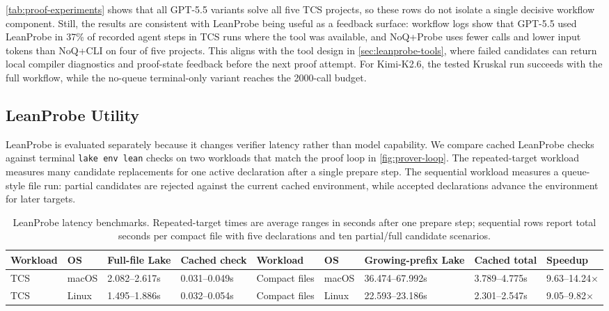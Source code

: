 \documentclass{article}
\newcommand{\kimi}{Kimi-K2.6\xspace}
\newcommand{\gpt}{GPT-5.5\xspace}
\begin{document}
\cref{tab:proof-experiments} shows that all \gpt variants solve all five TCS projects, so these rows do not isolate a single decisive workflow component.
Still, the results are consistent with LeanProbe being useful as a feedback surface: workflow logs show that \gpt used LeanProbe in 37\% of recorded agent steps in TCS runs where the tool was available, and NoQ+Probe uses fewer calls and lower input tokens than NoQ+CLI on four of five projects.
This aligns with the tool design in \cref{sec:leanprobe-tools}, where failed candidates can return local compiler diagnostics and proof-state feedback before the next proof attempt.
For \kimi, the tested Kruskal run succeeds with the full workflow, while the no-queue terminal-only variant reaches the 2000-call budget.

\subsection{LeanProbe Utility}

LeanProbe is evaluated separately because it changes verifier latency rather than model capability.
We compare cached LeanProbe checks against terminal \texttt{lake env lean} checks on two workloads that match the proof loop in \cref{fig:prover-loop}.
The repeated-target workload measures many candidate replacements for one active declaration after a single prepare step.
The sequential workload measures a queue-style file run: partial candidates are rejected against the current cached environment, while accepted declarations advance the environment for later targets.

\begin{table}[t]
\centering
\caption{LeanProbe latency benchmarks. Repeated-target times are average ranges in seconds after one prepare step; sequential rows report total seconds per compact file with five declarations and ten partial/full candidate scenarios.}
\label{tab:leanprobe-summary}
\footnotesize
\setlength{\tabcolsep}{3pt}
\begin{tabular}{@{}llll@{\hspace{7mm}}lllll@{}}
\toprule
Workload & OS & Full-file Lake & Cached check &
Workload & OS & Growing-prefix Lake & Cached total & Speedup \\
\midrule
TCS & macOS & 2.082--2.617s & 0.031--0.049s &
Compact files & macOS & 36.474--67.992s & 3.789--4.775s & 9.63--14.24$\times$ \\
TCS & Linux & 1.495--1.886s & 0.032--0.054s &
Compact files & Linux & 22.593--23.186s & 2.301--2.547s & 9.05--9.82$\times$ \\
\bottomrule
\end{tabular}
\end{table}
\end{document}
